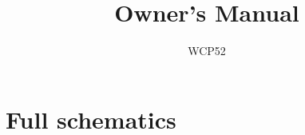 \documentclass[article,oneside]{memoir}
\title{Owner's Manual}
\author{WCP52}
\begin{document}
\pagestyle{headings}

\begin{multicols}{2}

\tableofcontents
\listoffigures

\newpage


\newpage


\newpage


\newpage



\end{multicols}

\newpage
\chapter{Full schematics}

\newpage

\end{document}
